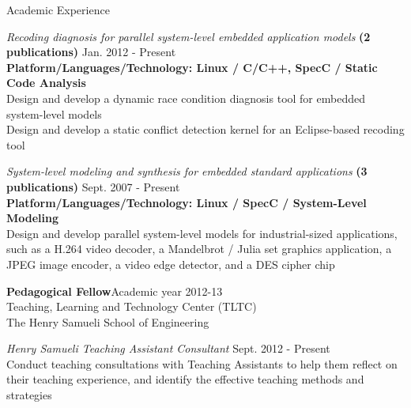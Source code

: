 \documentclass{resume} %
\begin{document}
\begin{rSection}{Academic Experience}
\begin{itemize}
{\item  \textit{Recoding diagnosis for parallel system-level embedded application models}   {\bf (2 publications)} \hfill{Jan. 2012 - Present}\\
{\footnotesize  {\bf Platform/Languages/Technology: Linux / C/C++, SpecC / Static Code Analysis}} \\
Design and develop a dynamic race condition diagnosis tool for embedded system-level models\\
Design and develop a static conflict detection kernel for an Eclipse-based recoding tool 

\begin{comment}
\item \textit{ConcurrenC: a novel Model of Computation (MoC) for effective system-level abstraction of C-based System-Level Description Languages (SLDLs)}  \hfill{June 2008 - June 2009}\\
Proposed the ConcurrenC MoC with features of communication and computation separation, hierarchy, concurrency, abstract communication, timing, execution semantics, and precisely expressive in both SystemC and SpecC SLDLs
\end{comment}

\item   \textit{System-level modeling and synthesis for embedded standard applications} {\bf (3 publications)} \hfill{Sept. 2007 - Present}\\
{\footnotesize  {\bf Platform/Languages/Technology: Linux / SpecC / System-Level Modeling}} \\
Design and develop parallel system-level models for industrial-sized applications, such as a H.264 video decoder, a Mandelbrot / Julia set graphics application, a JPEG image encoder, a video edge detector, and a DES cipher chip
}
\end{itemize}


\textbf{Pedagogical Fellow}\hfill{Academic year 2012-13}\\
{Teaching, Learning and Technology Center (TLTC) \\ The Henry Samueli School of Engineering}
\begin{itemize}
{\small
\item  \textit{Henry Samueli Teaching Assistant Consultant} \hfill{Sept. 2012 - Present}\\
Conduct teaching consultations with Teaching Assistants to help them reflect on their teaching experience, and identify the effective teaching methods and strategies

}
\end{itemize}
\end{rSection}
\end{document}
